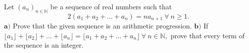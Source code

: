 Let $(a_n)_{n \in \mathbb{N}}$ be a sequence of real numbers such that $$2(a_1+a_2+…+a_n)=na_{n+1}~\forall~n \ge 1.$$$\textbf{a)}$ Prove that the given sequence is an arithmetic progression.
$\textbf{b)}$ If $\lfloor a_1 \rfloor + \lfloor a_2 \rfloor +…+ \lfloor a_n \rfloor = \lfloor a_1+a_2+…+a_n \rfloor~\forall~ n \in \mathbb{N},$ prove that every term of the sequence is an integer.